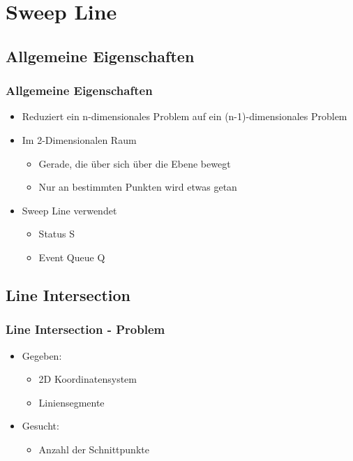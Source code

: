 \section{Sweep Line}
\subsection{Allgemeine Eigenschaften}
\begin{frame}
	\frametitle{{Allgemeine Eigenschaften}}
	\begin{itemize}
		\pause
		\item{Reduziert ein n-dimensionales Problem auf ein (n-1)-dimensionales Problem}
		\pause
		\item{Im 2-Dimensionalen Raum}
		\pause
		\begin{itemize}
			\item{Gerade, die über sich über die Ebene bewegt}
			\pause
			\item{Nur an bestimmten Punkten wird etwas getan}
		\end{itemize}
		\pause
		\item{Sweep Line verwendet}
		\pause		
		\begin{itemize}
			\item{Status S}
			\pause
			\item{Event Queue Q}
		\end{itemize}
	\end{itemize}
\end{frame}
\subsection{Line Intersection}
\begin{frame}
	\frametitle{{Line Intersection - Problem}}
	\begin{itemize}
		\pause
		\item{Gegeben:}
		\pause
		\begin{itemize}
			\item{2D Koordinatensystem}
			\pause
			\item{Liniensegmente}
		\end{itemize}
		\pause
		\item{Gesucht:}
		\pause
		\begin{itemize}
			\item{Anzahl der Schnittpunkte}
		\end{itemize}
	\end{itemize}
\end{frame}